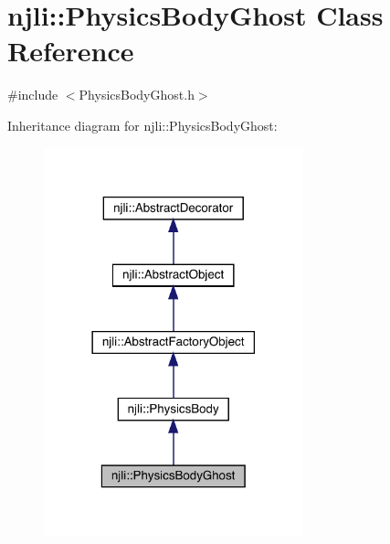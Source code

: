 \hypertarget{classnjli_1_1_physics_body_ghost}{}\section{njli\+:\+:Physics\+Body\+Ghost Class Reference}
\label{classnjli_1_1_physics_body_ghost}


{\ttfamily \#include $<$Physics\+Body\+Ghost.\+h$>$}



Inheritance diagram for njli\+:\+:Physics\+Body\+Ghost\+:\nopagebreak
\begin{figure}[H]
\begin{center}
\leavevmode
\includegraphics[width=213pt]{classnjli_1_1_physics_body_ghost__inherit__graph}
\end{center}
\end{figure}


